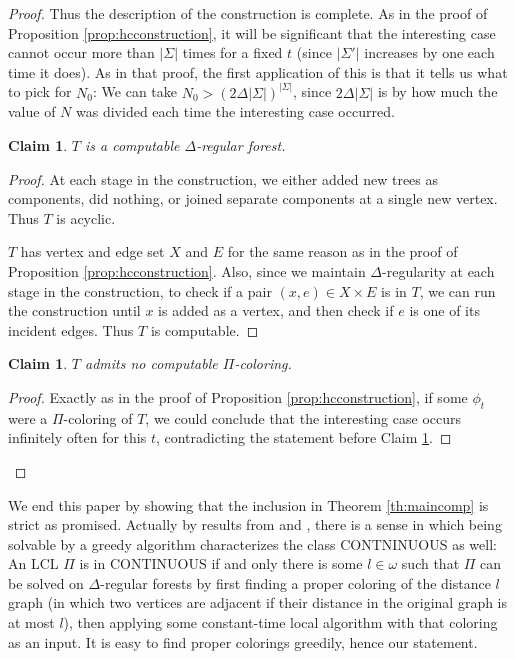 \documentclass[11pt]{amsart}
\newtheorem{claim}[theorem]{Claim}
\theoremstyle{definition}
\begin{document}
\begin{proof}
Thus the description of the construction is complete. As in the proof of Proposition \ref{prop:hcconstruction}, it will be significant that the interesting case cannot occur more than $|\Sigma|$ times for a fixed $t$ (since $|\Sigma'|$ increases by one each time it does). As in that proof, the first application of this is that it tells us what to pick for $N_0$: We can take $N_0 > (2\Delta |\Sigma|)^{|\Sigma|}$, since $2\Delta|\Sigma|$ is by how much the value of $N$ was divided each time the interesting case occurred. 

\begin{claim}\label{claim:Tcomp2}
$T$ is a computable $\Delta$-regular forest.
\end{claim}

\begin{proof}
    At each stage in the construction, we either added new trees as components, did nothing, or joined separate components at a single new vertex. Thus $T$ is acyclic.
    
    $T$ has vertex and edge set $X$ and $E$ for the same reason as in the proof of Proposition \ref{prop:hcconstruction}. Also, since we maintain $\Delta$-regularity at each stage in the construction, to check if a pair $(x,e) \in X \times E$ is in $T$, we can run the construction until $x$ is added as a vertex, and then check if $e$ is one of its incident edges. Thus $T$ is computable.
\end{proof}

\begin{claim}
$T$ admits no computable $\Pi$-coloring.
\end{claim}

\begin{proof}
    Exactly as in the proof of Proposition \ref{prop:hcconstruction}, if some $\phi_t$ were a $\Pi$-coloring of $T$, we could conclude that the interesting case occurs infinitely often for this $t$, contradicting the statement before Claim \ref{claim:Tcomp2}.
\end{proof}

\end{proof}

We end this paper by showing that the inclusion in Theorem \ref{th:maincomp} is strict as promised. Actually by results from \cite{BCG_Trees2} and \cite{CKP_Speedup}, there is a sense in which being solvable by a greedy algorithm characterizes the class CONTNINUOUS as well: An LCL $\Pi$ is in CONTINUOUS if and only there is some $l \in \omega$ such that $\Pi$ can be solved on $\Delta$-regular forests by first finding a proper coloring of the distance $l$ graph (in which two vertices are adjacent if their distance in the original graph is at most $l$), then applying some constant-time local algorithm with that coloring as an input. It is easy to find proper colorings greedily, hence our statement. 
\end{document}
